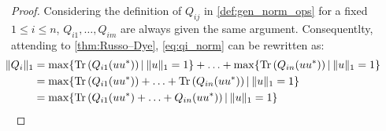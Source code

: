\begin{proof}
Considering the definition of $Q_{ij}$ in \autoref{def:gen_norm_ops} for a fixed $1 \leq i \leq n$, $Q_{i1}, \ldots, Q_{im}$ are always given the same argument.
Consequentlty, attending to \autoref{thm:Russo–Dye}, \autoref{eq:qi_norm} can be rewritten as:
\begin{align} 
  \hspace{-30pt} \lVert Q_i \rVert_{1} & = \max \{\text{Tr}\left(Q_{i1}(uu^{*}) \right) \vert \hspace{2pt}  \lVert u \rVert_{1}=1 \} + \ldots +  \max \{\text{Tr}\left(Q_{in}(u u^{*}) \right) \vert \hspace{2pt}  \lVert u \rVert_{1}=1 \}\\ \label{eq:qi_ptp_norm_1}
  \hspace{-30pt} & =  \max \{ \text{Tr}\left(Q_{i1}(uu^{*}) \right) + \ldots + \text{Tr}\left(Q_{in}(u u^{*}) \right) \vert \hspace{2pt}  \lVert u \rVert_{1}=1 \} \\
  \hspace{-30pt} & =  \max \{ \text{Tr}\left(Q_{i1}(uu^{*}) + \ldots + Q_{in}(u u^{*}) \right) \vert \hspace{2pt}  \lVert u \rVert_{1}=1 \}  \label{eq:qi_ptp_norm_3}
\end{align}

\end{proof}
